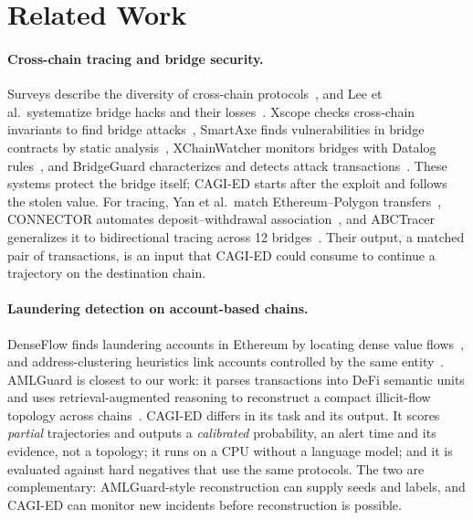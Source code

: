 \section{Related Work}
\label{sec:related}

\paragraph{Cross-chain tracing and bridge security.}
Surveys describe the diversity of cross-chain protocols~\cite{robinson2021survey,ou2022overview}, and Lee et al.\ systematize bridge hacks and their losses~\cite{lee2023sok}.
Xscope checks cross-chain invariants to find bridge attacks~\cite{zhang2022xscope}, SmartAxe finds vulnerabilities in bridge contracts by static analysis~\cite{liao2024smartaxe}, XChainWatcher monitors bridges with Datalog rules~\cite{augusto2025xchainwatcher}, and BridgeGuard characterizes and detects attack transactions~\cite{wu2025safeguarding}.
These systems protect the bridge itself; CAGI-ED starts after the exploit and follows the stolen value.
For tracing, Yan et al.\ match Ethereum--Polygon transfers~\cite{yan2025tracing}, CONNECTOR automates deposit--withdrawal association~\cite{lin2025connector}, and ABCTracer generalizes it to bidirectional tracing across 12 bridges~\cite{lin2025abctracer}.
Their output, a matched pair of transactions, is an input that CAGI-ED could consume to continue a trajectory on the destination chain.

\paragraph{Laundering detection on account-based chains.}
DenseFlow finds laundering accounts in Ethereum by locating dense value flows~\cite{lin2024denseflow}, and address-clustering heuristics link accounts controlled by the same entity~\cite{victor2020clustering}.
AMLGuard is closest to our work: it parses transactions into DeFi semantic units and uses retrieval-augmented reasoning to reconstruct a compact illicit-flow topology across chains~\cite{wu2026amlguard}.
CAGI-ED differs in its task and its output.
It scores \emph{partial} trajectories and outputs a \emph{calibrated} probability, an alert time and its evidence, not a topology; it runs on a CPU without a language model; and it is evaluated against hard negatives that use the same protocols.
The two are complementary: AMLGuard-style reconstruction can supply seeds and labels, and CAGI-ED can monitor new incidents before reconstruction is possible.

